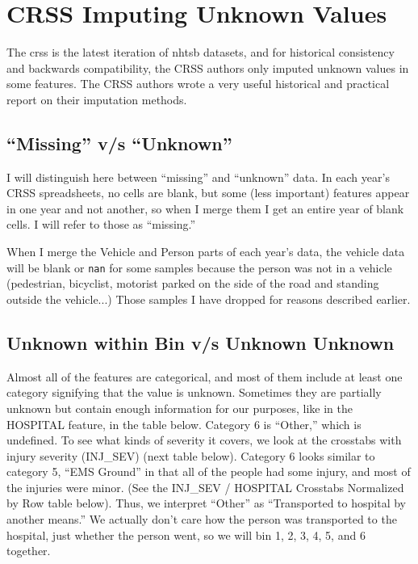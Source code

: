 \section{CRSS Imputing Unknown Values}
\label{sec:CRSS_Imputing}


The \acrfull{crss} is the latest iteration of \acrfull{nhtsb} datasets, and for historical consistency and backwards compatibility, the CRSS authors only imputed unknown values in some features.  The CRSS authors wrote a very useful historical and practical report on their imputation methods.  \cite{CRSS_Imputation}

\subsection{``Missing'' v/s ``Unknown''}

I will distinguish here between ``missing'' and ``unknown'' data.  In each year's CRSS spreadsheets, no cells are blank, but some (less important) features appear in one year and not another, so when I merge them I get an entire year of blank cells.  I will refer to those as ``missing.''  

When I merge the Vehicle and Person parts of each year's data, the vehicle data will be blank or \verb|nan| for some samples because the person was not in a vehicle (pedestrian, bicyclist, motorist parked on the side of the road and standing outside the vehicle...)  Those samples I have dropped for reasons described earlier.  

\subsection{Unknown within Bin v/s Unknown Unknown}

Almost all of the features are categorical, and most of them include at least one category signifying that the value is unknown.  Sometimes they are partially unknown but contain enough information for our purposes, like in the HOSPITAL feature, in the table below.  Category 6 is ``Other,'' which is undefined.  To see what kinds of severity it covers, we look at the crosstabs with injury severity (INJ\_SEV) (next table below).  Category 6 looks similar to  category 5, ``EMS Ground'' in that all of the people had some injury, and most of the injuries were minor.  (See the INJ\_SEV / HOSPITAL Crosstabs Normalized by Row table below).  Thus, we interpret ``Other'' as ``Transported to hospital by another means.''  We actually don't care how the person was transported to the hospital, just whether the person went, so we will bin 1, 2, 3, 4, 5, and 6 together.  

